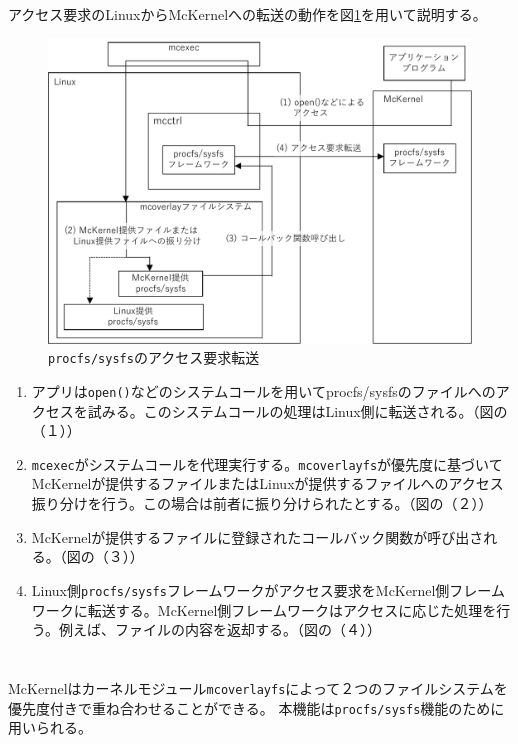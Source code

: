 \documentclass[twoside,11pt,fleqn]{book}
\begin{document}
\subsection{}
アクセス要求のLinuxからMcKernelへの転送の動作を図\ref{fig:spec-os-mck-procfs-access}を用いて説明する。
%
\begin{figure}[!htb]
\centering
\includegraphics[width=12cm]{figs/procfs_access.pdf}
\vspace{-0em}\caption{\texttt{procfs/sysfs}のアクセス要求転送}
\label{fig:spec-os-mck-procfs-access}
\vspace{-0em}
\end{figure}
%
\begin{enumerate}
\item アプリは\texttt{open()}などのシステムコールを用いてprocfs/sysfsのファイルへのアクセスを試みる。このシステムコールの処理はLinux側に転送される。（図の（１））
\item \texttt{mcexec}がシステムコールを代理実行する。\texttt{mcoverlayfs}が優先度に基づいてMcKernelが提供するファイルまたはLinuxが提供するファイルへのアクセス振り分けを行う。この場合は前者に振り分けられたとする。（図の（２））
\item McKernelが提供するファイルに登録されたコールバック関数が呼び出される。（図の（３））
\item Linux側\texttt{procfs/sysfs}フレームワークがアクセス要求をMcKernel側フレームワークに転送する。McKernel側フレームワークはアクセスに応じた処理を行う。例えば、ファイルの内容を返却する。（図の（４））
\end{enumerate}
\FloatBarrier

\section{}\label{sec:mcoverlayfs}
McKernelはカーネルモジュール\texttt{mcoverlayfs}によって２つのファイルシステムを優先度付きで重ね合わせることができる。
本機能は\texttt{procfs/sysfs}機能のために用いられる。
\end{document}
